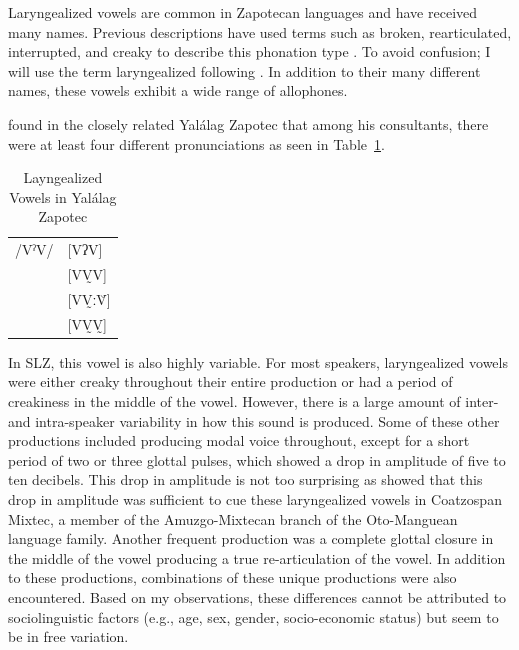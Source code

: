 \documentclass[12pt, letterpaper]{article}
\providecommand{\lsptoprule}{\midrule\toprule}
\providecommand{\lspbottomrule}{\bottomrule\midrule}
\begin{document}
Laryngealized vowels are common in Zapotecan languages and have received many names. Previous descriptions have used terms such as broken, rearticulated, interrupted, and creaky to describe this phonation type \citep{longDiccionarioZapotecoSan2005,avelinobecerraTopicsYalalagZapotec2004,avelinoAcousticElectroglottographicAnalyses2010,sonnenscheinDescriptiveGrammarSan2005,adlerAcousticsPhonationTypes2016}. To avoid confusion; I will use the term laryngealized following \citet{avelinoAcousticElectroglottographicAnalyses2010}. In addition to their many different names, these vowels exhibit a wide range of allophones. 

\citet{avelinoAcousticElectroglottographicAnalyses2010} found in the closely related Yalálag Zapotec that among his consultants, there were at least four different pronunciations as seen in Table~\ref{tab:laryngeal}. 
\begin{table}[!h]
	\centering
	\caption{Layngealized Vowels in Yalálag Zapotec}
	\label{tab:laryngeal}
	 \begin{tabular}{ll}
	\lsptoprule
	/VˀV/	&  [VʔV]  \\
			&  [VV̰V]   \\
			&  [VV̰ːV̆]  \\
			&  [VV̰V̰]	\\
	\lspbottomrule
	\end{tabular}
\end{table}

In SLZ, this vowel is also highly variable. For most speakers, laryngealized vowels were either creaky throughout their entire production or had a period of creakiness in the middle of the vowel. However, there is a large amount of inter- and intra-speaker variability in how this sound is produced. Some of these other productions included producing modal voice throughout, except for a short period of two or three glottal pulses, which showed a drop in amplitude of five to ten decibels. This drop in amplitude is not too surprising as \citet{gerfenProductionPerceptionLaryngealized2005} showed that this drop in amplitude was sufficient to cue these laryngealized vowels in Coatzospan Mixtec, a member of the Amuzgo-Mixtecan branch of the Oto-Manguean language family. Another frequent production was a complete glottal closure in the middle of the vowel producing a true re-articulation of the vowel. In addition to these productions, combinations of these unique productions were also encountered. Based on my observations, these differences cannot be attributed to sociolinguistic factors (e.g., age, sex, gender, socio-economic status) but seem to be in free variation. 
\end{document}
